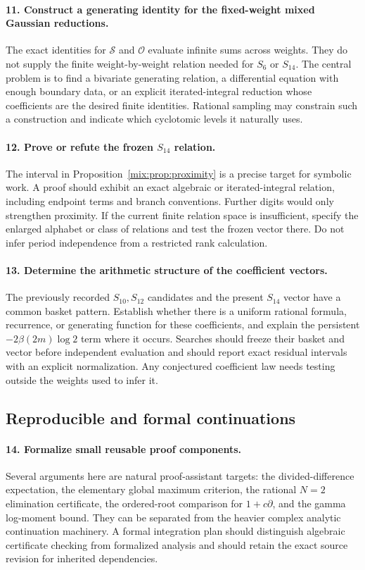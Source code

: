 \paragraph{11. Construct a generating identity for the fixed-weight
mixed Gaussian reductions.}
The exact identities for $\mathcal S$ and $\mathcal O$ evaluate
infinite sums across weights. They do not supply the finite
weight-by-weight relation needed for $S_6$ or $S_{14}$.
The central problem is to find a bivariate generating relation,
a differential equation with enough boundary data, or an explicit
iterated-integral reduction whose coefficients are the desired
finite identities. Rational sampling may constrain such a
construction and indicate which cyclotomic levels it naturally uses.

\paragraph{12. Prove or refute the frozen $S_{14}$ relation.}
The interval in Proposition~\ref{mix:prop:proximity} is a precise
target for symbolic work. A proof should exhibit an exact algebraic
or iterated-integral relation, including endpoint terms and branch
conventions. Further digits would only strengthen proximity.
If the current finite relation space is insufficient, specify the
enlarged alphabet or class of relations and test the frozen vector
there. Do not infer period independence from a restricted rank
calculation.

\paragraph{13. Determine the arithmetic structure of the coefficient
vectors.}
The previously recorded $S_{10},S_{12}$ candidates and the present
$S_{14}$ vector have a common basket pattern. Establish whether
there is a uniform rational formula, recurrence, or generating
function for these coefficients, and explain the persistent
$-2\beta(2m)\log2$ term where it occurs. Searches should freeze
their basket and vector before independent evaluation and should
report exact residual intervals with an explicit normalization.
Any conjectured coefficient law needs testing outside the weights
used to infer it.

\subsection{Reproducible and formal continuations}

\paragraph{14. Formalize small reusable proof components.}
Several arguments here are natural proof-assistant targets:
the divided-difference expectation, the elementary global
maximum criterion, the rational $N=2$ elimination certificate,
the ordered-root comparison for $1+c\partial$, and the gamma
log-moment bound. They can be separated from the heavier complex
analytic continuation machinery. A formal integration plan should
distinguish algebraic certificate checking from formalized analysis
and should retain the exact source revision for inherited
dependencies.

